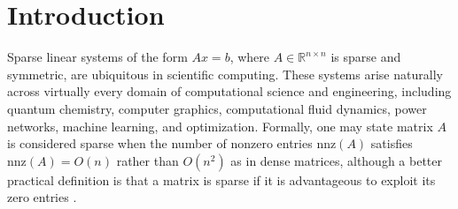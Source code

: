 \chapter{Introduction}
\label{ch:introduction}



Sparse linear systems of the form $Ax = b$, where $A \in \mathbb{R}^{n \times n}$ is sparse and symmetric, are ubiquitous in scientific computing. These systems arise naturally across virtually every domain of computational science and engineering, including quantum chemistry, computer graphics, computational fluid dynamics, power networks, machine learning, and optimization. Formally, one may state matrix $A$ is considered sparse when the number of nonzero entries $\text{nnz}(A)$ satisfies $\text{nnz}(A) = O(n)$ rather than $O(n^2)$ as in dense matrices, although a better practical definition is that a matrix is sparse if it is advantageous to exploit its zero entries \cite{scott_introduction_2023}.



